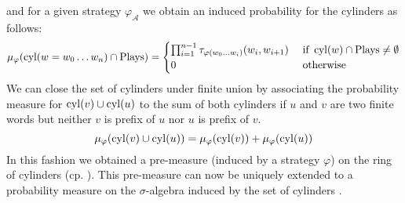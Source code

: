 and for a given strategy $\varphi_{\mathcal{A}}$ we obtain an induced
probability for the cylinders as follows:
\begin{equation}
  \mu_{\varphi}(\operatorname{cyl}(w = w_{0}\dots w_{n})\cap\operatorname{Plays}) = \begin{cases}
    \prod_{i=1}^{n-1}\tau_{\varphi(w_{0}\dots w_{i})}(w_{i}, w_{i+1})
      &\text{ if }\operatorname{cyl}(w)\cap\operatorname{Plays}\neq\emptyset\\
    0 &\text{ otherwise}
  \end{cases}
\end{equation}
We can close the set of cylinders under finite union by associating
the probability measure for $\operatorname{cyl}(v)\cup\operatorname{cyl}(u)$ to the sum of both cylinders
if $u$ and $v$ are two finite words but neither $v$ is prefix of $u$ nor $u$
is prefix of $v$.
\begin{equation}
  \mu_{\varphi}(\operatorname{cyl}(v)\cup\operatorname{cyl}(u)) = \mu_{\varphi}(\operatorname{cyl}(v)) 
  + \mu_{\varphi}(\operatorname{cyl}(u))
\end{equation}
In this fashion we obtained a pre-measure (induced by a strategy $\varphi$) on
the ring of cylinders (cp. \cite[Chapter 1 and Chapter 3]{Bauer}). This
pre-measure can now be uniquely extended to a probability measure on the
$\sigma$-algebra induced by the set of cylinders \cite[Theorem 5.4]{Bauer}.

